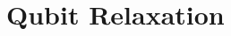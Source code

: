 \documentclass[../../main.tex]{subfiles}
\begin{document}
\section{Qubit Relaxation}
\end{document}
